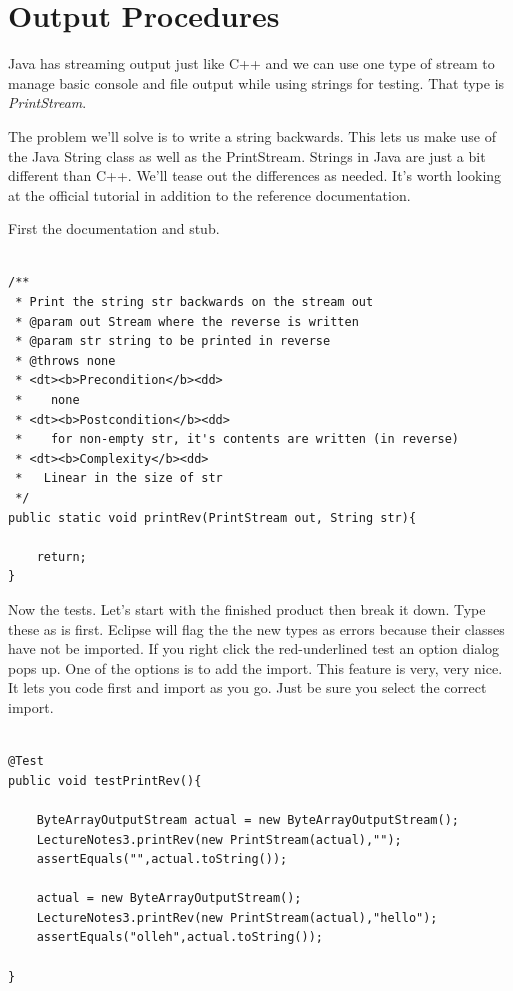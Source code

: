 \documentclass[]{tufte-handout}
\begin{document}
\section{Output Procedures}

Java has streaming output just like C++ and we can use one type of stream to manage basic console and file output while using strings for testing. That type is \textit{PrintStream}. 

The problem we'll solve is to write a string backwards. This lets us make use of the Java String class as well as the PrintStream. Strings in Java are just a bit different than C++. We'll tease out the differences as needed. It's worth looking at the official tutorial in addition to the reference documentation.

First the documentation and stub.

\begin{lstlisting}

/**
 * Print the string str backwards on the stream out
 * @param out Stream where the reverse is written
 * @param str string to be printed in reverse
 * @throws none
 * <dt><b>Precondition</b><dd>
 *    none
 * <dt><b>Postcondition</b><dd>
 *    for non-empty str, it's contents are written (in reverse)
 * <dt><b>Complexity</b><dd> 	 
 *   Linear in the size of str
 */
public static void printRev(PrintStream out, String str){
		
	return;
}

\end{lstlisting}

Now the tests. Let's start with the finished product then break it down. Type these as is first. Eclipse will flag the the new types as errors because their classes have not be imported. If you right click the red-underlined test an option dialog pops up. One of the options is to add the import. This feature is very, very nice. It lets you code first and import as you go. Just be sure you select the correct import. 

\begin{lstlisting}

@Test
public void testPrintRev(){
		
	ByteArrayOutputStream actual = new ByteArrayOutputStream();
	LectureNotes3.printRev(new PrintStream(actual),"");
	assertEquals("",actual.toString());

	actual = new ByteArrayOutputStream();
	LectureNotes3.printRev(new PrintStream(actual),"hello");
	assertEquals("olleh",actual.toString());	
	
}

\end{lstlisting} 
\end{document}
